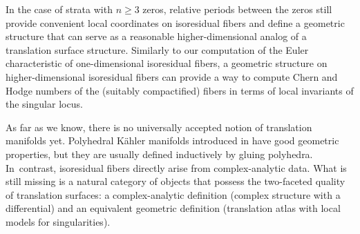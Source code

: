 \begin{rmk}
In the case of strata with $n \geq 3$ zeros, relative periods between the zeros still provide convenient local coordinates on isoresidual fibers and define a geometric structure that can serve as a reasonable higher-dimensional analog of a translation surface structure. Similarly to our computation of the Euler characteristic of one-dimensional isoresidual fibers, a geometric structure on higher-dimensional isoresidual fibers can provide a way to compute Chern and Hodge numbers of the (suitably compactified) fibers in terms of local invariants of the singular locus.

As far as we know, there is no universally accepted notion of translation manifolds yet. Polyhedral Kähler manifolds introduced in \cite{Pan} have good geometric properties, but they are usually defined inductively by gluing polyhedra. In~contrast, isoresidual fibers directly arise from complex-analytic data. What is still missing is a natural category of objects that possess the two-faceted quality of translation surfaces: a complex-analytic definition (complex structure with a differential) and an equivalent geometric definition (translation atlas with local models for singularities).
\end{rmk}


